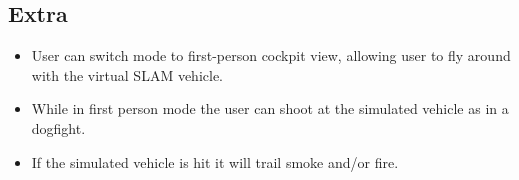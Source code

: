 \documentclass[11pt]{article}
\begin{document}
\subsection*{Extra}
\begin{itemize}
\item User can switch mode to first-person cockpit view, allowing user to fly around with the virtual SLAM vehicle.
\item While in first person mode the user can shoot at the simulated vehicle as in a dogfight.
\item If the simulated vehicle is hit it will trail smoke and/or fire.
\end{itemize}
\end{document}
